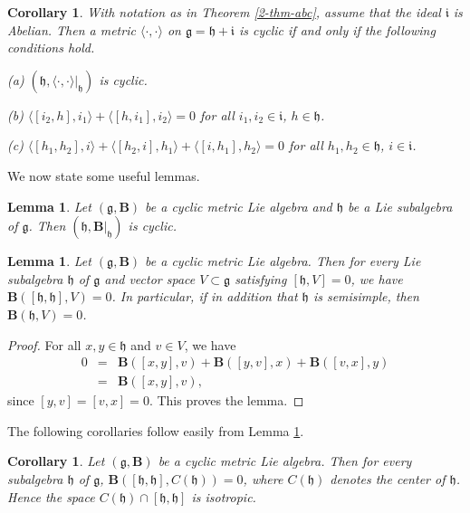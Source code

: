 \documentclass[reqno]{amsart}
\newtheorem{lem}[thm]{Lemma}
\newtheorem{cor}[thm]{Corollary}
\theoremstyle{definition}
\begin{document}
\begin{cor}\label{2-cor-decom-abelian}
With notation as in Theorem \ref{2-thm-abc}, assume that the ideal $\mathfrak{i}$ is Abelian. Then
a metric $\langle\cdot,\cdot\rangle$ on $\mathfrak{g}=\mathfrak{h}+\mathfrak{i}$ is cyclic if and only if the following conditions hold.

(a)  $(\mathfrak{h},\langle\cdot,\cdot\rangle|_{\mathfrak{h}})$ is cyclic.

(b) $\langle[i_{2},h],i_{1}\rangle+\langle[h,i_{1}],i_{2}\rangle=0$
for all $i_{1},i_{2}\in \mathfrak{i}$, $h\in \mathfrak{h}$.


(c) $\langle[h_{1},h_{2}],i\rangle+\langle[h_{2},i],h_{1}\rangle+\langle[i,h_{1}],h_{2}\rangle=0$
for all $h_{1},h_{2}\in \mathfrak{h}$, $i\in \mathfrak{i}$.
\end{cor}

We now state some useful lemmas.
\begin{lem}\label{2-lem-subalgebra}
Let $(\mathfrak{g},\mathbf{B})$ be a cyclic metric Lie algebra and $\mathfrak{h}$ be a Lie subalgebra of $\mathfrak{g}$.
 Then $(\mathfrak{h},\mathbf{B}|_{\mathfrak{h}})$ is cyclic.
\end{lem}

\begin{lem}\label{2-lem-decomposition}
Let $(\mathfrak{g},\mathbf{B})$ be a cyclic metric Lie algebra. Then for every  Lie subalgebra $\mathfrak{h}$ of $\mathfrak{g}$ and vector space $V\subset \mathfrak{g}$ satisfying $[\mathfrak{h},V]=0$, we have
$\mathbf{B}([\mathfrak{h},\mathfrak{h}],V)=0$.
In particular, if in addition that $\mathfrak{h}$ is semisimple, then  $\mathbf{B}(\mathfrak{h},V)=0$.
\end{lem}
\begin{proof}
For all $x,y\in\mathfrak{h}$ and $v\in V$, we have
\begin{eqnarray*}
0&=&\mathbf{B}([x,y],v)+\mathbf{B}([y,v],x)+\mathbf{B}([v,x],y)\\
 &=&\mathbf{B}([x,y],v),
\end{eqnarray*}
since $[y,v]=[v,x]=0$.
This proves the lemma.
\end{proof}

The following corollaries follow easily from Lemma \ref{2-lem-decomposition}.
\begin{cor}\label{2-cor-isotropic}
Let $(\mathfrak{g}, \mathbf{B})$ be a cyclic metric Lie algebra.
Then for every subalgebra $\mathfrak{h}$ of $\mathfrak{g}$,
$\mathbf{B}([\mathfrak{h},\mathfrak{h}],C(\mathfrak{h}))=0$, where $C(\mathfrak{h})$ denotes the center of $\mathfrak{h}$. Hence the space $C(\mathfrak{h})\cap [\mathfrak{h},\mathfrak{h}]$ is isotropic.
\end{cor}
\end{document}
